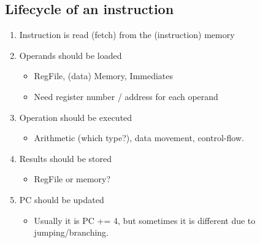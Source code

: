 \documentclass[10pt]{article}
\begin{document}
\subsection*{Lifecycle of an instruction}
\begin{enumerate}
    \item Instruction is read (fetch) from the (instruction) memory
    \item Operands should be loaded
    \begin{itemize}
        \item RegFile, (data) Memory, Immediates
        \item Need register number / address for each operand
    \end{itemize}
    \item Operation should be executed
    \begin{itemize}
        \item Arithmetic (which type?), data movement, control-flow.
    \end{itemize}
    \item Results should be stored
    \begin{itemize}
        \item RegFile or memory?
    \end{itemize}
    \item PC should be updated
    \begin{itemize}
        \item Usually it is PC += 4, but sometimes it is different due to jumping/branching.
    \end{itemize}
\end{enumerate}
\end{document}
